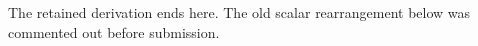 \documentclass{article}
\begin{document}
The retained derivation ends here.  The old scalar rearrangement below was
commented out before submission.
\end{document}

